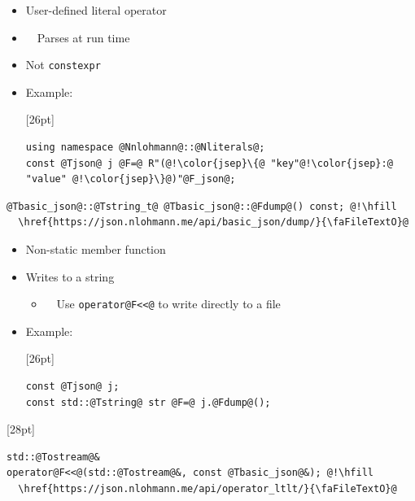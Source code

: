 \documentclass{slides}
\makeatletter
\newcommand{\@slidetitle}{}
\newcommand{\slidetitle}[1]{\renewcommand{\@slidetitle}{#1}}
\makeatother
\begin{document}
\begin{itemize}
  \item User-defined literal operator
  \item {\color{orange}\faWarning}\ \ Parses at run time
  \item Not \lstinline{constexpr}
  \item Example:
    \begin{tcolorbox}{\F{16pt}[26pt]
    \begin{lstlisting}
using namespace @Nnlohmann@::@Nliterals@;
const @Tjson@ j @F=@ R"(@!\color{jsep}\{@ "key"@!\color{jsep}:@ "value" @!\color{jsep}\}@)"@F_json@;
    \end{lstlisting}
    }\end{tcolorbox}
\end{itemize}

\pagebreak
\slidetitle{Emitting}

\begin{tcolorbox}{\F{19pt}
\begin{lstlisting}
@Tbasic_json@::@Tstring_t@ @Tbasic_json@::@Fdump@() const; @!\hfill
  \href{https://json.nlohmann.me/api/basic_json/dump/}{\faFileTextO}@
\end{lstlisting}
}\end{tcolorbox}

\begin{itemize}
  \item Non-static member function
  \item Writes to a string
  \begin{itemize}
    \item {\color{orange}\faWarning}\ \ Use \lstinline{operator@F<<@}{}
      to write directly to a file
  \end{itemize}
  \item Example:
    \begin{tcolorbox}{\F{16pt}[26pt]
    \begin{lstlisting}
const @Tjson@ j;
const std::@Tstring@ str @F=@ j.@Fdump@();
    \end{lstlisting}
    }\end{tcolorbox}
\end{itemize}

\pagebreak
\slidetitle{Emitting}

\begin{tcolorbox}{\F{19pt}[28pt]
\begin{lstlisting}
std::@Tostream@&
operator@F<<@(std::@Tostream@&, const @Tbasic_json@&); @!\hfill
  \href{https://json.nlohmann.me/api/operator_ltlt/}{\faFileTextO}@
\end{lstlisting}
}\end{tcolorbox}
\end{document}
